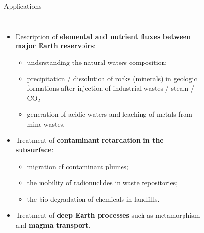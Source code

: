 %
\begin{frame}{Applications}
	\begin{columns}[t]
			\vskip -5pt
			\begin{itemize}
				\item Description of {\bf elemental and nutrient fluxes between major Earth reservoirs}:				%
				\begin{itemize}
					\item understanding the natural waters composition;
					\item precipitation / dissolution of rocks (minerals) in geologic formations after injection of industrial wastes / steam / CO$_2$; 
					\item generation of acidic waters and leaching of metals from mine wastes.	
				\end{itemize}
				\pause
				\item Treatment of {\bf contaminant retardation in the subsurface}:
				\begin{itemize}
					\item migration of contaminant plumes;
					\item the mobility of radionuclides in waste repositories;  
					\item the bio-degradation of chemicals in landfills. 
				\end{itemize}
				\pause
				\item Treatment of {\bf deep Earth processes} such as metamorphism and {\bf magma transport}.
			\end{itemize}
		
		\vskip -20pt
		\begin{figure}[!t]
			\centering
			 \\
			 \\
		\end{figure}
	\end{columns}


\end{frame}
